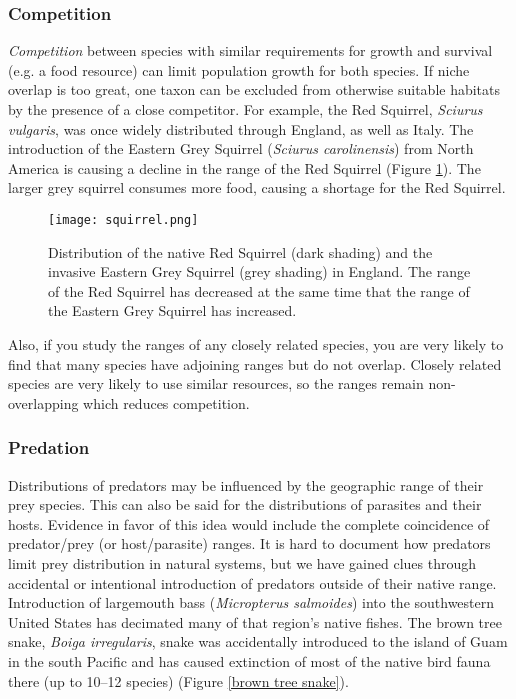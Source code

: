\documentclass[11pt, hidelinks]{article}
\begin{document}
\subsubsection{Competition}
\emph{Competition} between species with similar requirements for growth and survival (e.g. a food resource) can limit population growth for both species. If niche overlap is too great, one taxon can be excluded from otherwise suitable habitats by the presence of a close competitor.  For example, the Red Squirrel, \emph{Sciurus vulgaris}, was once widely distributed through England, as well as Italy.  The introduction of the Eastern Grey Squirrel (\emph{Sciurus carolinensis}) from North America is causing a decline in the range of the Red Squirrel (Figure \ref{squirrel}).  The larger grey squirrel consumes more food, causing a shortage for the Red Squirrel. 

\begin{figure}[hb]
	\centering
	\texttt{[image: squirrel.png]}
	\caption{Distribution of the native Red Squirrel (dark shading) and the invasive Eastern Grey Squirrel (grey shading) in England. The range of the Red Squirrel has decreased at the same time that the range of the Eastern Grey Squirrel has increased.\label{squirrel}}
\end{figure}

Also, if you study the ranges of any closely related species, you are very likely to find that many species have adjoining ranges but do not overlap.  Closely related species are very likely to use similar resources, so the ranges remain non-overlapping which reduces competition. 

\subsubsection{Predation}
Distributions of predators may be influenced by the geographic range of their prey species. This can also be said for the distributions of parasites and their hosts. Evidence in favor of this idea would include the complete coincidence of predator/prey (or host/parasite) ranges. It is hard to document how predators limit prey distribution in natural systems, but we have gained clues through accidental or intentional introduction of predators outside of their native range. Introduction of largemouth bass (\emph{Micropterus salmoides}) into the southwestern United States has decimated many of that region's native fishes.  The brown tree snake, \emph{Boiga irregularis}, snake was accidentally introduced  to the island of Guam in the south Pacific and has caused extinction of most of the native bird fauna there (up to 10--12 species) (Figure \ref{brown tree snake}). 
\end{document}
